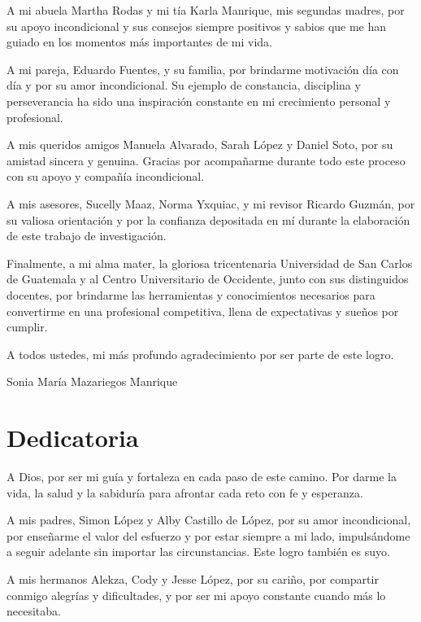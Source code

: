 \documentclass[11pt,letterpaper]{report}
\begin{document}
A mi abuela Martha Rodas y mi tía Karla Manrique, mis segundas madres, por su 
apoyo incondicional y sus consejos siempre positivos y sabios que me han 
guiado en los momentos más importantes de mi vida.

A mi pareja, Eduardo Fuentes, y su familia, por brindarme motivación día con 
día y por su amor incondicional. Su ejemplo de constancia, disciplina y 
perseverancia ha sido una inspiración constante en mi crecimiento personal y 
profesional.

A mis queridos amigos Manuela Alvarado, Sarah López y Daniel Soto, por su 
amistad sincera y genuina. Gracias por acompañarme durante todo este proceso 
con su apoyo y compañía incondicional.

A mis asesores, Sucelly Maaz, Norma Yxquiac, y mi revisor Ricardo Guzmán, por su
valiosa orientación y por la confianza depositada en mí durante la elaboración
de este trabajo de investigación.

Finalmente, a mi alma mater, la gloriosa tricentenaria Universidad de San 
Carlos de Guatemala y al Centro Universitario de Occidente, junto con sus 
distinguidos docentes, por brindarme las herramientas y conocimientos 
necesarios para convertirme en una profesional competitiva, llena de 
expectativas y sueños por cumplir.

A todos ustedes, mi más profundo agradecimiento por ser parte de este logro.

\vspace{1cm}

\begin{flushright}
Sonia María Mazariegos Manrique
\end{flushright}

\chapter*{Dedicatoria}

A Dios, por ser mi guía y fortaleza en cada paso de este camino. Por darme la 
vida, la salud y la sabiduría para afrontar cada reto con fe y esperanza.

A mis padres, Simon López y Alby Castillo de López, por su amor incondicional, 
por enseñarme el valor del esfuerzo y por estar siempre a mi lado, 
impulsándome a seguir adelante sin importar las circunstancias. Este logro 
también es suyo.

A mis hermanos Alekza, Cody y Jesse López, por su cariño, por compartir 
conmigo alegrías y dificultades, y por ser mi apoyo constante cuando más lo 
necesitaba.
\end{document}
